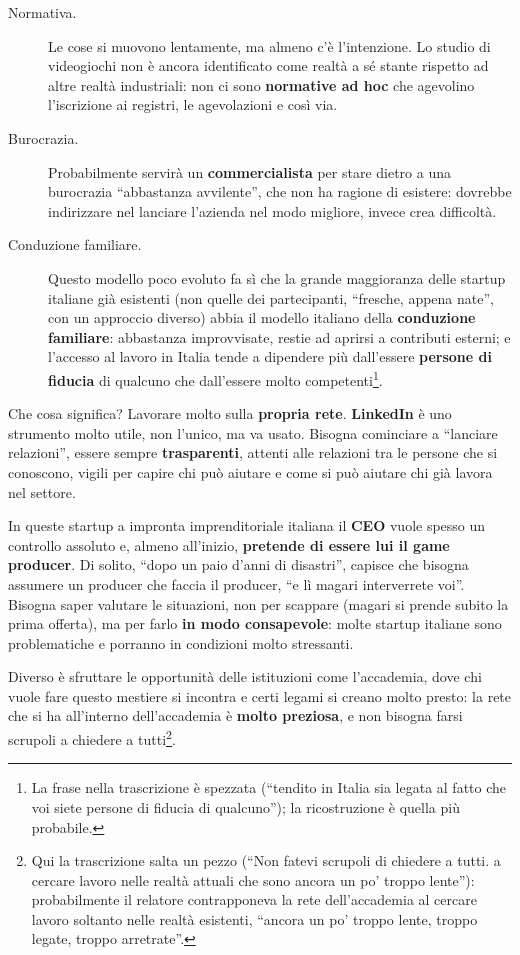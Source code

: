 \begin{description}
  \item[Normativa.] Le cose si muovono lentamente, ma almeno c'è l'intenzione. Lo
        studio di videogiochi non è ancora identificato come realtà a sé stante
        rispetto ad altre realtà industriali: non ci sono \textbf{normative ad
        hoc} che agevolino l'iscrizione ai registri, le agevolazioni e così via.
  \item[Burocrazia.] Probabilmente servirà un \textbf{commercialista} per
        stare dietro a una burocrazia ``abbastanza avvilente'', che non ha
        ragione di esistere: dovrebbe indirizzare nel lanciare l'azienda nel modo
        migliore, invece crea difficoltà.
  \item[Conduzione familiare.] Questo modello poco evoluto fa sì che la grande
        maggioranza delle startup italiane già esistenti (non quelle dei
        partecipanti, ``fresche, appena nate'', con un approccio diverso) abbia
        il modello italiano della \textbf{conduzione familiare}: abbastanza
        improvvisate, restie ad aprirsi a contributi esterni; e l'accesso al
        lavoro in Italia tende a dipendere più dall'essere \textbf{persone di
        fiducia} di qualcuno che dall'essere molto competenti\footnote{La frase
        nella trascrizione è spezzata (``tendito in Italia sia legata al fatto
        che voi siete persone di fiducia di qualcuno''); la ricostruzione è
        quella più probabile.}.
\end{description}

Che cosa significa? Lavorare molto sulla \textbf{propria rete}.
\textbf{LinkedIn} è uno strumento molto utile, non l'unico, ma va usato. Bisogna
cominciare a ``lanciare relazioni'', essere sempre \textbf{trasparenti}, attenti
alle relazioni tra le persone che si conoscono, vigili per capire chi può
aiutare e come si può aiutare chi già lavora nel settore.

In queste startup a impronta imprenditoriale italiana il \textbf{CEO} vuole
spesso un controllo assoluto e, almeno all'inizio, \textbf{pretende di essere
lui il game producer}. Di solito, ``dopo un paio d'anni di disastri'', capisce
che bisogna assumere un producer che faccia il producer, ``e lì magari
interverrete voi''. Bisogna saper valutare le situazioni, non per scappare
(magari si prende subito la prima offerta), ma per farlo \textbf{in modo
consapevole}: molte startup italiane sono problematiche e porranno in
condizioni molto stressanti.

Diverso è sfruttare le opportunità delle istituzioni come l'accademia, dove chi
vuole fare questo mestiere si incontra e certi legami si creano molto presto: la
rete che si ha all'interno dell'accademia è \textbf{molto preziosa}, e non
bisogna farsi scrupoli a chiedere a tutti\footnote{Qui la trascrizione salta un
pezzo (``Non fatevi scrupoli di chiedere a tutti. a cercare lavoro nelle realtà
attuali che sono ancora un po' troppo lente''): probabilmente il relatore
contrapponeva la rete dell'accademia al cercare lavoro soltanto nelle realtà
esistenti, ``ancora un po' troppo lente, troppo legate, troppo arretrate''.}.

